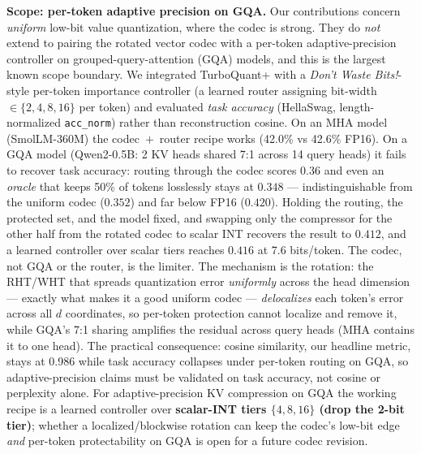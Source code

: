 \documentclass{article}
\begin{document}
\textbf{Scope: per-token adaptive precision on GQA.}
Our contributions concern \emph{uniform} low-bit value quantization, where the codec is strong. They do \emph{not} extend to pairing the rotated vector codec with a per-token adaptive-precision controller on grouped-query-attention (GQA) models, and this is the largest known scope boundary. We integrated TurboQuant+ with a \emph{Don't Waste Bits!}-style per-token importance controller (a learned router assigning bit-width $\in\{2,4,8,16\}$ per token) and evaluated \emph{task accuracy} (HellaSwag, length-normalized \texttt{acc\_norm}) rather than reconstruction cosine. On an MHA model (SmolLM-360M) the codec~$+$~router recipe works (42.0\% vs 42.6\% FP16). On a GQA model (Qwen2-0.5B: 2 KV heads shared 7:1 across 14 query heads) it fails to recover task accuracy: routing through the codec scores $0.36$ and even an \emph{oracle} that keeps 50\% of tokens losslessly stays at $0.348$ — indistinguishable from the uniform codec ($0.352$) and far below FP16 ($0.420$). Holding the routing, the protected set, and the model fixed, and swapping only the compressor for the other half from the rotated codec to scalar INT recovers the result to $0.412$, and a learned controller over scalar tiers reaches $0.416$ at 7.6 bits/token. The codec, not GQA or the router, is the limiter. The mechanism is the rotation: the RHT/WHT that spreads quantization error \emph{uniformly} across the head dimension — exactly what makes it a good uniform codec — \emph{delocalizes} each token's error across all $d$ coordinates, so per-token protection cannot localize and remove it, while GQA's 7:1 sharing amplifies the residual across query heads (MHA contains it to one head). The practical consequence: cosine similarity, our headline metric, stays at 0.986 while task accuracy collapses under per-token routing on GQA, so adaptive-precision claims must be validated on task accuracy, not cosine or perplexity alone. For adaptive-precision KV compression on GQA the working recipe is a learned controller over \textbf{scalar-INT tiers $\{4,8,16\}$ (drop the 2-bit tier)}; whether a localized/blockwise rotation can keep the codec's low-bit edge \emph{and} per-token protectability on GQA is open for a future codec revision.
\end{document}
